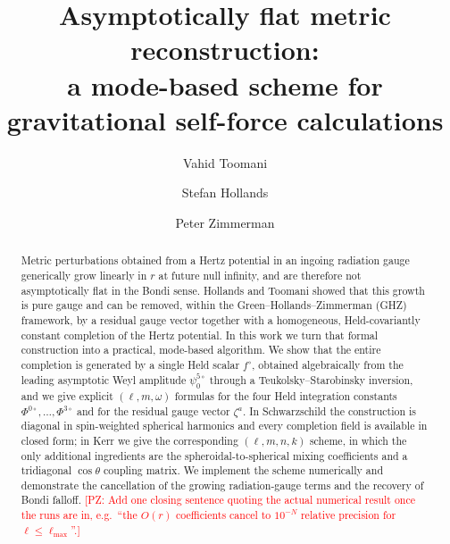 \documentclass[preprint,aps,nofootinbib,a4paper,superscriptaddress,longbibliography,amsfonts, amssymb,amsmath,titlepage]{revtex4-1}
\numberwithin{equation}{section} %
\newcommand{\PZ}[1]{\textcolor{red}{\textsf{[PZ: #1]}}}
\newcommand{\emm}{m}
\def\l{\ensuremath{\ell}}
\def\fHo{f^{\circ}}
\newcommand{\PhiN}[1]{\Phi^{#1\circ}}
\def\psifive{\psi^{5\circ}_{0}}
\begin{document}
\title{Asymptotically flat metric reconstruction:\\ a mode-based scheme for gravitational self-force calculations}

\author{Vahid Toomani}
\author{Stefan Hollands}
\author{Peter Zimmerman}

\begin{abstract}
Metric perturbations obtained from a Hertz potential in an ingoing radiation
gauge generically grow linearly in $r$ at future null infinity, and are
therefore not asymptotically flat in the Bondi sense.  Hollands and Toomani
showed that this growth is pure gauge and can be removed, within the
Green--Hollands--Zimmerman (GHZ) framework, by a residual gauge vector
together with a homogeneous, Held-covariantly constant completion of the
Hertz potential.  In this work we turn that formal construction into a
practical, mode-based algorithm.  We show that the entire completion is
generated by a single Held scalar $\fHo$, obtained algebraically from the
leading asymptotic Weyl amplitude $\psifive$ through a Teukolsky--Starobinsky
inversion, and we give explicit $(\l,\emm,\omega)$ formulas for the four
Held integration constants $\PhiN{0},\dots,\PhiN{3}$ and for the residual
gauge vector $\zeta^a$.  In Schwarzschild the construction is diagonal in
spin-weighted spherical harmonics and every completion field is available in
closed form; in Kerr we give the corresponding $(\l,\emm,n,k)$ scheme, in
which the only additional ingredients are the spheroidal-to-spherical mixing
coefficients and a tridiagonal $\cos\theta$ coupling matrix.  We implement
the scheme numerically and demonstrate the cancellation of the growing
radiation-gauge terms and the recovery of Bondi falloff.
\PZ{Add one closing sentence quoting the actual numerical result once the
runs are in, e.g.\ ``the $O(r)$ coefficients cancel to $10^{-N}$ relative
precision for $\l\le\l_{\max}$''.}
\end{abstract}

\maketitle
\end{document}
